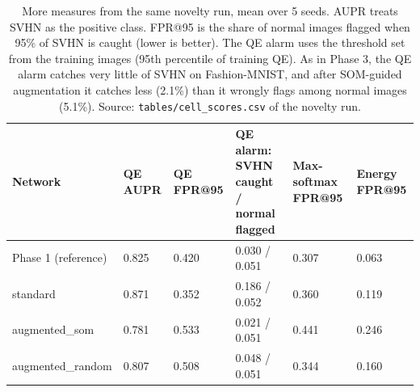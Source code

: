 \documentclass[11pt]{article}
\begin{document}
\begin{table}[H]
\centering
\renewcommand{\arraystretch}{1.1}
\footnotesize
{\setlength{\tabcolsep}{4pt}\begin{tabular}{|l|C{0.11\textwidth}|C{0.13\textwidth}|C{0.20\textwidth}|C{0.13\textwidth}|C{0.13\textwidth}|}
\hline
\textbf{Network} & \textbf{QE AUPR} & \textbf{QE FPR@95} & \textbf{QE alarm: SVHN caught / normal flagged} & \textbf{Max-softmax FPR@95} & \textbf{Energy FPR@95} \\ \hline
Phase 1 (reference) & 0.825 & 0.420 & 0.030 / 0.051 & 0.307 & 0.063 \\ \hline
standard & 0.871 & 0.352 & 0.186 / 0.052 & 0.360 & 0.119 \\ \hline
augmented\_som & 0.781 & 0.533 & 0.021 / 0.051 & 0.441 & 0.246 \\ \hline
augmented\_random & 0.807 & 0.508 & 0.048 / 0.051 & 0.344 & 0.160 \\ \hline
\end{tabular}}
\caption{More measures from the same novelty run, mean over 5 seeds. AUPR treats SVHN as the positive class. FPR@95 is the share of normal images flagged when 95\% of SVHN is caught (lower is better). The QE alarm uses the threshold set from the training images (95th percentile of training QE). As in Phase 3, the QE alarm catches very little of SVHN on Fashion-MNIST, and after SOM-guided augmentation it catches less (2.1\%) than it wrongly flags among normal images (5.1\%). Source: \texttt{tables/cell\_scores.csv} of the novelty run.}
\label{tab:novelty_more}
\end{table}
\end{document}
